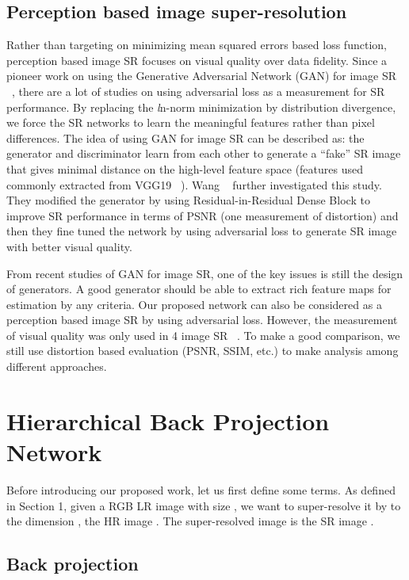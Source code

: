 \documentclass[10pt,twocolumn,letterpaper]{article}
\begin{document}
\subsection{Perception based image super-resolution}
Rather than targeting on minimizing mean squared errors based loss function, perception based image SR focuses on visual quality over data fidelity. Since a pioneer work on using the Generative Adversarial Network (GAN) for image SR ~\cite{SRGAN}, there are a lot of studies on using adversarial loss as a measurement for SR performance. By replacing the \textit{l}n-norm minimization by distribution divergence, we force the SR networks to learn the meaningful features rather than pixel differences. The idea of using GAN for image SR can be described as: the generator and discriminator learn from each other to generate a ``fake'' SR image that gives minimal distance on the high-level feature space (features used commonly extracted from VGG19 ~\cite{VGG}). Wang \etal ~\cite{ESRGAN} further investigated this study. They modified the generator by using Residual-in-Residual Dense Block to improve SR performance in terms of PSNR (one measurement of distortion) and then they fine tuned the network by using adversarial loss to generate SR image with better visual quality.

From recent studies of GAN for image SR, one of the key issues is still the design of generators. A good generator should be able to extract rich feature maps for estimation by any criteria. Our proposed network can also be considered as a perception based image SR by using adversarial loss. However, the measurement of visual quality was only used in 4 image SR ~\cite{SRGAN,EnhanceNet,ESRGAN}. To make a good comparison, we still use distortion based evaluation (PSNR, SSIM, etc.) to make analysis among different approaches.

\section{Hierarchical Back Projection Network}
Before introducing our proposed work, let us first define some terms. As defined in Section 1, given a RGB LR image  with size , we want to super-resolve it by  to the dimension , the HR image . The super-resolved image is the SR image .

\subsection{Back projection}
\end{document}
